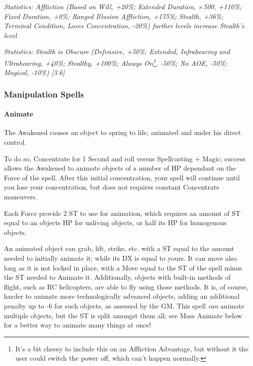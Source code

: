 \begin{multicols}{3}
	\textcolor{OliveGreen}{\textit{Statistics: Affliction (Based on Will, +20\%; Extended Duration, $\times$500, +110\%; Fixed Duration, +0\%; Ranged Illusion Affliction, +175\%; Stealth, +36\%; Terminal Condition, Loses Concentration, -20\%) further levels increase Stealth's level}}
	
	\textcolor{OliveGreen}{\textit{Statistics: Stealth is Obscure (Defensive, +50\%; Extended, Infrahearing and Ultrahearing, +40\%; Stealthy, +100\%; Always On\footnote{It's a bit cheesy to include this on an Affliction Advantage, but without it the user could switch the power off, which can't happen normally.}, -50\%; No AOE, -50\%; Magical, -10\%) [3.6] }}
	
	\subsubsection{Manipulation Spells}
	
	\paragraph{Animate}
	
	The Awakened causes an object to spring to life, animated and under his direct control.
	
	To do so, Concentrate for 1 Second and roll versus Spellcasting + Magic; success allows the Awakened to animate objects of a number of HP dependant on the Force of the spell. After this initial concentration, your spell will continue until you lose your concentration, but does not requires constant Concentrate maneuvers.
	
	Each Force provide 2 ST to use for animation, which requires an amount of ST equal to an objects HP for unliving objects, or half its HP for homogenous objects.
	
	An animated object can grab, lift, strike, etc. with a ST equal to the amount needed to initially animate it; while its DX is equal to yours. It can move also long as it is not locked in place, with a Move equal to the ST of the spell minus the ST needed to Animate it. Additionally, objects with built-in methods of flight, such as RC helicopters, are able to fly using those methods. It is, of course, harder to animate more technologically advanced objects, adding an additional penalty up to -6 for such objects, as assessed by the GM. This spell \textit{can} animate multiple objects, but the ST is split amongst them all; see Mass Animate below for a better way to animate many things at once!
	

\end{multicols}
